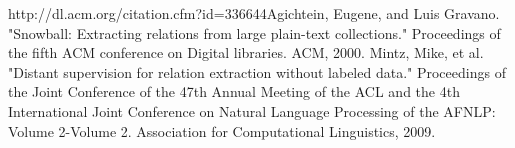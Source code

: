 \begin{thebibliography}{9}
  \label{snowball}
 http://dl.acm.org/citation.cfm?id=336644Agichtein, Eugene, and Luis Gravano. "Snowball: Extracting relations from large plain-text collections." Proceedings of the fifth ACM conference on Digital libraries. ACM, 2000.
 \label{mintz}
Mintz, Mike, et al. "Distant supervision for relation extraction without labeled data." Proceedings of the Joint Conference of the 47th Annual Meeting of the ACL and the 4th International Joint Conference on Natural Language Processing of the AFNLP: Volume 2-Volume 2. Association for Computational Linguistics, 2009.
 \end{thebibliography}

